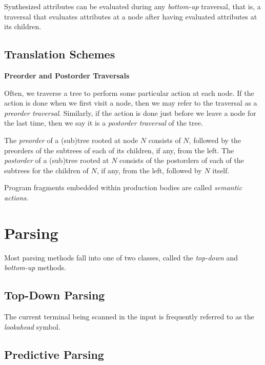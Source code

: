 \documentclass[a4paper,twoside]{book}
\begin{document}
Synthesized attributes can be evaluated during any \textit{bottom-up} traversal, that is, a traversal that evaluates attributes at a node after having evaluated attributes at its children.

\subsection{Translation Schemes}

\begin{framed}
    \begin{center}
        \textbf{{\large Preorder and Postorder Traversals}}
    \end{center}

    Often, we traverse a tree to perform some particular action at each node. If the action is done when we first visit a node, then we may refer to the traversal as a \textit{preorder traversal}. Similarly, if the action is done just before we leave a node for the last time, then we say it is a \textit{postorder traversal} of the tree.

    The \textit{preorder} of a (sub)tree rooted at node $N$ consists of $N$, followed by the preorders of the subtrees of each of its children, if any, from the left. The \textit{postorder} of a (sub)tree rooted at $N$ consists of the postorders of each of the subtrees for the children of $N$, if any, from the left, followed by $N$ itself.
\end{framed}

Program fragments embedded within production bodies are called \textit{semantic actions}.

\section{Parsing}

Most parsing methods fall into one of two classes, called the \textit{top-down} and \textit{bottom-up} methods.

\subsection{Top-Down Parsing}

The current terminal being scanned in the input is frequently referred to as the \textit{lookahead} symbol.

\subsection{Predictive Parsing}
\end{document}
